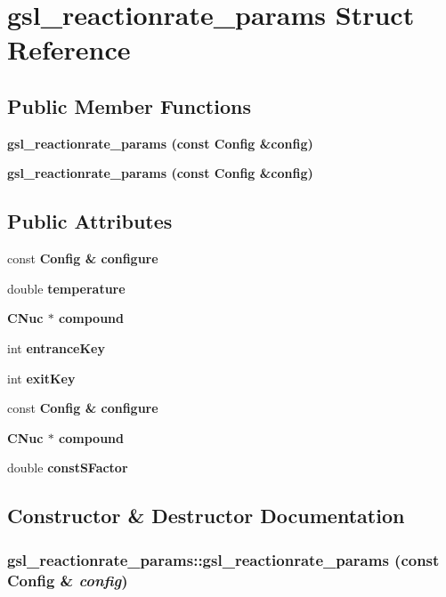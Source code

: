 \section{gsl\_\-reactionrate\_\-params Struct Reference}
\label{structgsl__reactionrate__params}
\subsection*{Public Member Functions}
\begin{CompactItemize}
\item 
\bf{gsl\_\-reactionrate\_\-params} (const \bf{Config} \&config)
\item 
\bf{gsl\_\-reactionrate\_\-params} (const \bf{Config} \&config)
\end{CompactItemize}
\subsection*{Public Attributes}
\begin{CompactItemize}
\item 
const \bf{Config} \& \bf{configure}
\item 
double \bf{temperature}
\item 
\bf{CNuc} $\ast$ \bf{compound}
\item 
int \bf{entrance\-Key}
\item 
int \bf{exit\-Key}
\item 
const \bf{Config} \& \bf{configure}
\item 
\bf{CNuc} $\ast$ \bf{compound}
\item 
double \bf{const\-SFactor}
\end{CompactItemize}


\subsection{Constructor \& Destructor Documentation}
\subsubsection{\setlength{\rightskip}{0pt plus 5cm}gsl\_\-reactionrate\_\-params::gsl\_\-reactionrate\_\-params (const \bf{Config} \& {\em config})\hspace{0.3cm}{\tt  [inline]}}\label{structgsl__reactionrate__params_757992912e0ab2ebdd3d5f5069ad6ba4}


